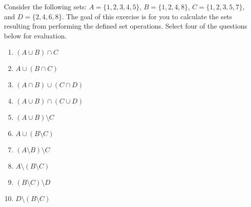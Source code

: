 \documentclass[11pt]{article}
\newcommand{\myset}[1]{\{#1\}}
\begin{document}
%
%  
%  
%  
%

\begin{myExercise}
Consider the following sets: $A = \myset{1,2,3,4,5}$, $B = \myset{1,2,4,8}$, $C = \myset{1,2,3,5,7}$, and $D = \myset{2,4,6,8}$. The goal of this exercise is for you to calculate the sets resulting from performing the defined set operations.  Select four of the questions below for evaluation.
\begin{enumerate}[label=(\alph*)]
\item $(A \cup B)  \cap C$
\item $A \cup (B \cap C)$
\item $(A \cap B) \cup (C \cap D)$
\item $(A \cup B) \cap (C \cup D)$
\item $(A \cup B) \setminus C$
\item $A \cup (B \setminus C)$
\item $(A \setminus B) \setminus C$
\item $A \setminus (B \setminus C)$
\item $(B \setminus C) \setminus D$
\item $D \setminus (B \setminus C)$
\end{enumerate}

\end{myExercise}
\end{document}
